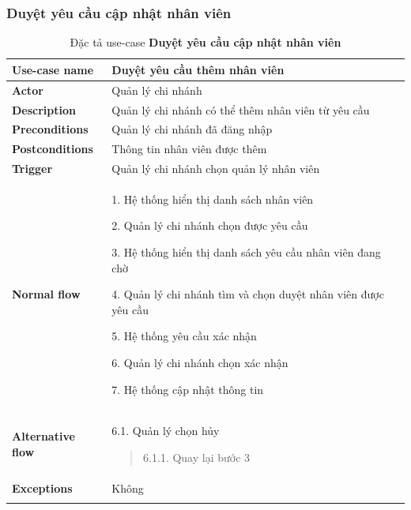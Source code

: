 \subsubsection{Duyệt yêu cầu cập nhật nhân viên}
{
    \setlength\extrarowheight{6pt}
    \begin{longtable}{| p{} | p{} |}
        \hline
        \textbf{Use-case name}
         &
        Duyệt yêu cầu thêm nhân viên
        \\
        \hline
        \textbf{Actor}
         &
        Quản lý chi nhánh
        \\
        \hline
        \textbf{Description}
         &
        Quản lý chi nhánh có thể thêm nhân viên từ yêu cầu
        \\
        \hline
        \textbf{Preconditions}
         &
        Quản lý chi nhánh đã đăng nhập
        \\
        \hline
        \textbf{Postconditions}
         &
        Thông tin nhân viên được thêm
        \\
        \hline
        \textbf{Trigger}
         &
        Quản lý chi nhánh chọn quản lý nhân viên
        \\
        \hline
        \begin{flushleft}
            \textbf{Normal flow}
        \end{flushleft}
         &
        1. Hệ thống hiển thị danh sách nhân viên

        2. Quản lý chi nhánh chọn được yêu cầu

        3. Hệ thống hiển thị danh sách yêu cầu nhân viên đang chờ

        4. Quản lý chi nhánh tìm và chọn duyệt nhân viên được yêu cầu

        5. Hệ thống yêu cầu xác nhận

        6. Quản lý chi nhánh chọn xác nhận

        7. Hệ thống cập nhật thông tin
        \\
        \hline
        \textbf{Alternative flow}
         &
        6.1. Quản lý chọn hủy
        \begin{quote}
            6.1.1. Quay lại bước 3
        \end{quote}
        \\
        \hline
        \textbf{Exceptions}
         &
        Không
        \\
        \hline
        \caption{Đặc tả use-case \textbf{Duyệt yêu cầu cập nhật nhân viên}}
    \end{longtable}
}


